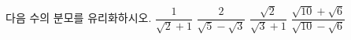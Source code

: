 다음 수의 분모를 유리화하시오.
 $\dfrac{1}{\sqrt{2}+1}$
 $\dfrac{2}{\sqrt{5}-\sqrt{3}}$
 $\dfrac{\sqrt{2}}{\sqrt{3}+1}$
 $\dfrac{\sqrt{10}+\sqrt{6}}{\sqrt{10}-\sqrt{6}}$
